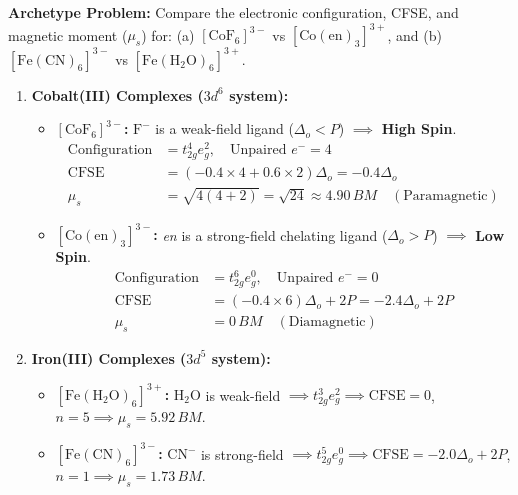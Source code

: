 \documentclass[10pt,twoside,openright]{book}
\begin{document}
\begin{usecasebox}
\textbf{Archetype Problem:} Compare the electronic configuration, CFSE, and magnetic moment ($\mu_s$) for:
(a) $[\mathrm{CoF_6}]^{3-}$ vs $[\mathrm{Co(en)_3}]^{3+}$, and (b) $[\mathrm{Fe(CN)_6}]^{3-}$ vs $[\mathrm{Fe(H_2O)_6}]^{3+}$.
\begin{enumerate}
  \item \textbf{Cobalt(III) Complexes ($3d^6$ system):}
  \begin{itemize}
    \item \textbf{$[\mathrm{CoF_6}]^{3-}$:} $\mathrm{F^-}$ is a weak-field ligand ($\Delta_o < P$) $\implies$ \textbf{High Spin}.
    \begin{align*}
      \text{Configuration} &= t_{2g}^4 e_g^2, \quad \text{Unpaired } e^- = 4 \\
      \text{CFSE} &= (-0.4 \times 4 + 0.6 \times 2)\Delta_o = -0.4\Delta_o \\
      \mu_s &= \sqrt{4(4+2)} = \sqrt{24} \approx 4.90\,\si{BM} \quad (\text{Paramagnetic})
    \end{align*}
    \item \textbf{$[\mathrm{Co(en)_3}]^{3-}$:} \textit{en} is a strong-field chelating ligand ($\Delta_o > P$) $\implies$ \textbf{Low Spin}.
    \begin{align*}
      \text{Configuration} &= t_{2g}^6 e_g^0, \quad \text{Unpaired } e^- = 0 \\
      \text{CFSE} &= (-0.4 \times 6)\Delta_o + 2P = -2.4\Delta_o + 2P \\
      \mu_s &= 0\,\si{BM} \quad (\text{Diamagnetic})
    \end{align*}
  \end{itemize}
  \item \textbf{Iron(III) Complexes ($3d^5$ system):}
  \begin{itemize}
    \item \textbf{$[\mathrm{Fe(H_2O)_6}]^{3+}$:} $\mathrm{H_2O}$ is weak-field $\implies t_{2g}^3 e_g^2 \implies \text{CFSE} = 0$, $n=5 \implies \mu_s = 5.92\,\si{BM}$.
    \item \textbf{$[\mathrm{Fe(CN)_6}]^{3-}$:} $\mathrm{CN^-}$ is strong-field $\implies t_{2g}^5 e_g^0 \implies \text{CFSE} = -2.0\Delta_o + 2P$, $n=1 \implies \mu_s = 1.73\,\si{BM}$.
  \end{itemize}
\end{enumerate}
\end{usecasebox}
\end{document}
